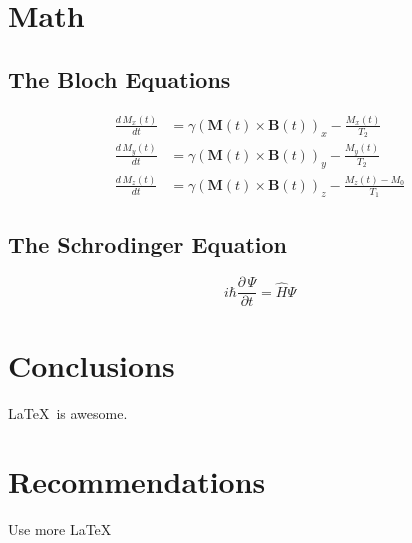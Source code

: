 \documentclass{workreport}
\begin{document}
\begin{body}
\section{Math}

\lipsum[1]

\subsection{The Bloch Equations}

	\begin{align}
		\frac{d\, M_x(t)}{dt} &= \gamma(\mathbf{M}(t) \times \mathbf{B}(t))_x - \frac{M_x(t)}{T_2} \\
		\frac{d\, M_y(t)}{dt} &= \gamma(\mathbf{M}(t) \times \mathbf{B}(t))_y - \frac{M_y(t)}{T_2} \\
		\frac{d\, M_z(t)}{dt} &= \gamma(\mathbf{M}(t) \times \mathbf{B}(t))_z - \frac{M_z(t) - M_0}{T_1}
	\end{align}
	
\subsection{The Schrodinger Equation}

	\begin{equation}
		i\hbar \frac{\partial \, \Psi}{\partial t} = \hat{H}\Psi
	\end{equation}
	
\section{Conclusions}
	\LaTeX \, is awesome.
	
\section{Recommendations}

	Use more \LaTeX

\end{body}
\end{document}
